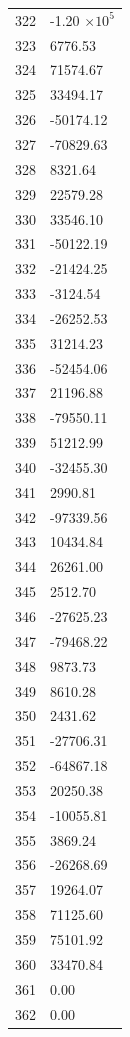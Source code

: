 \documentclass[a4paper,11pt]{article}
\begin{document}
\begin{center}
\begin{longtable}{|R{1.5cm}|R{2.6cm}|}
  322 &        -1.20 $\times 10^{           5}$ \\
  323 &      6776.53 \\
  324 &     71574.67 \\
  325 &     33494.17 \\
  326 &    -50174.12 \\
  327 &    -70829.63 \\
  328 &      8321.64 \\
  329 &     22579.28 \\
  330 &     33546.10 \\
  331 &    -50122.19 \\
  332 &    -21424.25 \\
  333 &     -3124.54 \\
  334 &    -26252.53 \\
  335 &     31214.23 \\
  336 &    -52454.06 \\
  337 &     21196.88 \\
  338 &    -79550.11 \\
  339 &     51212.99 \\
  340 &    -32455.30 \\
  341 &      2990.81 \\
  342 &    -97339.56 \\
  343 &     10434.84 \\
  344 &     26261.00 \\
  345 &      2512.70 \\
  346 &    -27625.23 \\
  347 &    -79468.22 \\
  348 &      9873.73 \\
  349 &      8610.28 \\
  350 &      2431.62 \\
  351 &    -27706.31 \\
  352 &    -64867.18 \\
  353 &     20250.38 \\
  354 &    -10055.81 \\
  355 &      3869.24 \\
  356 &    -26268.69 \\
  357 &     19264.07 \\
  358 &     71125.60 \\
  359 &     75101.92 \\
  360 &     33470.84 \\
  361 &         0.00 \\
  362 &         0.00 \\

\end{longtable}
\end{center}
\end{document}
